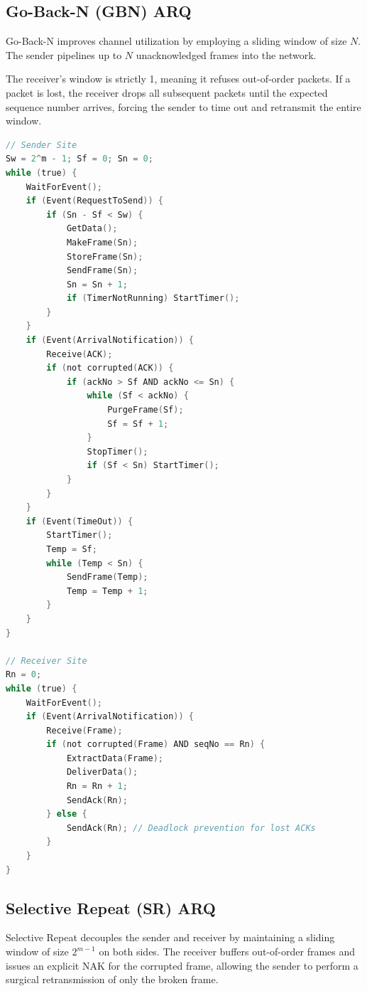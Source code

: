 \documentclass[12pt]{article}
\begin{document}
\subsection{Go-Back-N (GBN) ARQ}
Go-Back-N improves channel utilization by employing a sliding window of size $N$. The sender pipelines up to $N$ unacknowledged frames into the network. 

The receiver's window is strictly 1, meaning it refuses out-of-order packets. If a packet is lost, the receiver drops all subsequent packets until the expected sequence number arrives, forcing the sender to time out and retransmit the entire window.

\begin{lstlisting}[language=C, caption=Go-Back-N ARQ (Forouzan Pseudo-code)]
// Sender Site
Sw = 2^m - 1; Sf = 0; Sn = 0;
while (true) {
    WaitForEvent();
    if (Event(RequestToSend)) {
        if (Sn - Sf < Sw) {
            GetData();
            MakeFrame(Sn);
            StoreFrame(Sn);
            SendFrame(Sn);
            Sn = Sn + 1;
            if (TimerNotRunning) StartTimer();
        }
    }
    if (Event(ArrivalNotification)) {
        Receive(ACK);
        if (not corrupted(ACK)) {
            if (ackNo > Sf AND ackNo <= Sn) {
                while (Sf < ackNo) {
                    PurgeFrame(Sf);
                    Sf = Sf + 1;
                }
                StopTimer();
                if (Sf < Sn) StartTimer();
            }
        }
    }
    if (Event(TimeOut)) {
        StartTimer();
        Temp = Sf;
        while (Temp < Sn) {
            SendFrame(Temp);
            Temp = Temp + 1;
        }
    }
}

// Receiver Site
Rn = 0;
while (true) {
    WaitForEvent();
    if (Event(ArrivalNotification)) {
        Receive(Frame);
        if (not corrupted(Frame) AND seqNo == Rn) {
            ExtractData(Frame);
            DeliverData();
            Rn = Rn + 1;
            SendAck(Rn);
        } else {
            SendAck(Rn); // Deadlock prevention for lost ACKs
        }
    }
}
\end{lstlisting}

\subsection{Selective Repeat (SR) ARQ}
Selective Repeat decouples the sender and receiver by maintaining a sliding window of size $2^{m-1}$ on both sides. The receiver buffers out-of-order frames and issues an explicit NAK for the corrupted frame, allowing the sender to perform a surgical retransmission of only the broken frame.
\end{document}
